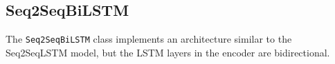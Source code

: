 
\subsection{Seq2SeqBiLSTM}
The \texttt{Seq2SeqBiLSTM} class implements an architecture similar to the Seq2SeqLSTM model, but the LSTM layers in the encoder are bidirectional.

